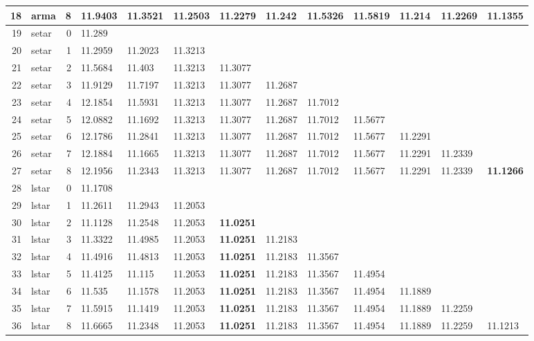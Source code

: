 \documentclass[10pt,a4paper]{article}
\begin{document}
\begin{table}[ht]
\begin{tabular}{rlrllllllllll}
  18 & arma &     8 & 11.9403 & 11.3521 & 11.2503 & 11.2279 & 11.242 & 11.5326 & 11.5819 & 11.214 & 11.2269 & \textbf{11.1355} \\ 
   \hline
19 & setar &     0 & 11.289 &  &  &  &  &  &  &  &  &  \\ 
  20 & setar &     1 & 11.2959 & 11.2023 & 11.3213 &  &  &  &  &  &  &  \\ 
  21 & setar &     2 & 11.5684 & 11.403 & 11.3213 & 11.3077 &  &  &  &  &  &  \\ 
  22 & setar &     3 & 11.9129 & 11.7197 & 11.3213 & 11.3077 & 11.2687 &  &  &  &  &  \\ 
  23 & setar &     4 & 12.1854 & 11.5931 & 11.3213 & 11.3077 & 11.2687 & 11.7012 &  &  &  &  \\ 
  24 & setar &     5 & 12.0882 & 11.1692 & 11.3213 & 11.3077 & 11.2687 & 11.7012 & 11.5677 &  &  &  \\ 
  25 & setar &     6 & 12.1786 & 11.2841 & 11.3213 & 11.3077 & 11.2687 & 11.7012 & 11.5677 & 11.2291 &  &  \\ 
  26 & setar &     7 & 12.1884 & 11.1665 & 11.3213 & 11.3077 & 11.2687 & 11.7012 & 11.5677 & 11.2291 & 11.2339 &  \\ 
  27 & setar &     8 & 12.1956 & 11.2343 & 11.3213 & 11.3077 & 11.2687 & 11.7012 & 11.5677 & 11.2291 & 11.2339 & \textbf{11.1266} \\ 
   \hline
28 & lstar &     0 & 11.1708 &  &  &  &  &  &  &  &  &  \\ 
  29 & lstar &     1 & 11.2611 & 11.2943 & 11.2053 &  &  &  &  &  &  &  \\ 
  30 & lstar &     2 & 11.1128 & 11.2548 & 11.2053 & \textbf{11.0251} &  &  &  &  &  &  \\ 
  31 & lstar &     3 & 11.3322 & 11.4985 & 11.2053 & \textbf{11.0251} & 11.2183 &  &  &  &  &  \\ 
  32 & lstar &     4 & 11.4916 & 11.4813 & 11.2053 & \textbf{11.0251} & 11.2183 & 11.3567 &  &  &  &  \\ 
  33 & lstar &     5 & 11.4125 & 11.115 & 11.2053 & \textbf{11.0251} & 11.2183 & 11.3567 & 11.4954 &  &  &  \\ 
  34 & lstar &     6 & 11.535 & 11.1578 & 11.2053 & \textbf{11.0251} & 11.2183 & 11.3567 & 11.4954 & 11.1889 &  &  \\ 
  35 & lstar &     7 & 11.5915 & 11.1419 & 11.2053 & \textbf{11.0251} & 11.2183 & 11.3567 & 11.4954 & 11.1889 & 11.2259 &  \\ 
  36 & lstar &     8 & 11.6665 & 11.2348 & 11.2053 & \textbf{11.0251} & 11.2183 & 11.3567 & 11.4954 & 11.1889 & 11.2259 & 11.1213 \\ 

\end{tabular}
\end{table}
\end{document}
